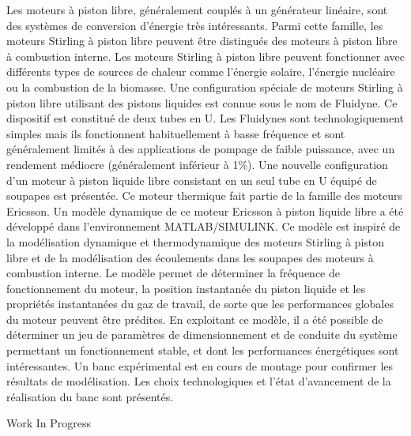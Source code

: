 {\normalsize
Les moteurs à piston libre, généralement couplés à un générateur linéaire, sont des systèmes de conversion d'énergie très intéressants. Parmi cette famille, les moteurs Stirling à piston libre peuvent être distingués des moteurs à piston libre à combustion interne. Les moteurs Stirling à piston libre peuvent fonctionner avec différents types de sources de chaleur comme l'énergie solaire, l'énergie nucléaire ou la combustion de la biomasse. Une configuration spéciale de moteurs Stirling à piston libre utilisant des pistons liquides est connue sous le nom de Fluidyne. Ce dispositif est constitué de deux tubes en U. Les Fluidynes sont technologiquement simples mais ils fonctionnent habituellement à basse fréquence et sont généralement limités à des applications de pompage de faible puissance, avec un rendement médiocre (généralement inférieur à 1\%). Une nouvelle configuration d'un moteur à piston liquide libre consistant en un seul tube en U équipé de soupapes est présentée. Ce moteur thermique fait partie de la famille des moteurs Ericsson. Un modèle dynamique de ce moteur Ericsson à piston liquide libre a été développé dans l'environnement MATLAB/SIMULINK. Ce modèle est inspiré de la modélisation dynamique et thermodynamique des moteurs Stirling à piston libre et de la modélisation des écoulements dans les soupapes des moteurs à combustion interne. Le modèle permet de déterminer la fréquence de fonctionnement du moteur, la position instantanée du piston liquide et les propriétés instantanées du gaz de travail, de sorte que les performances globales du moteur peuvent être prédites. En exploitant ce modèle, il a été possible de déterminer un jeu de paramètres de dimensionnement et de conduite du système permettant un fonctionnement stable, et dont les performances énergétiques sont intéressantes. Un banc expérimental est en cours de montage pour confirmer les résultats de modélisation. Les choix technologiques et l'état d'avancement de la réalisation du banc sont présentés.

 \vfill Work In Progress

}
 
